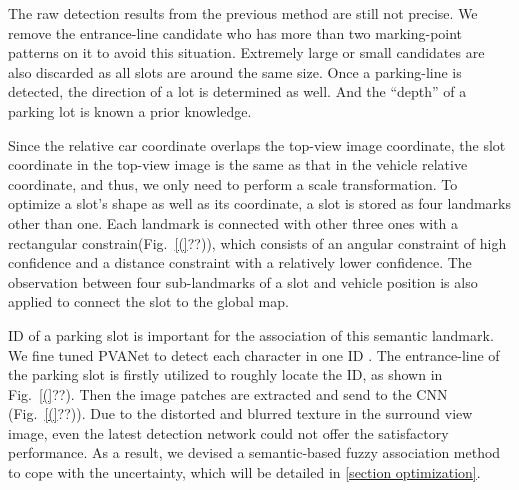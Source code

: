 \documentclass[journal]{IEEEtran}
\newcommand{\Reffig}[1]{Fig.~\ref{#1}}
\begin{document}
%
The raw detection results from the previous method are still not precise. 
We remove the entrance-line candidate who has more than two marking-point patterns on it to avoid this situation.  
Extremely large or small candidates are also discarded as all slots are around the same size.
Once a parking-line is detected, the direction of a lot is determined as well. And the “depth” of a parking lot is known a prior knowledge. 

Since the relative car coordinate overlaps the top-view image coordinate, the slot coordinate in the top-view image is the same as that in the vehicle relative coordinate, and thus, we only need to perform a scale transformation.
%
To optimize a slot's shape as well as its coordinate, a slot is stored as four landmarks other than one.
Each landmark is connected with other three ones with a rectangular constrain(\Reffig(??)), which consists of an angular constraint of high confidence and a distance constraint with a relatively lower confidence.
The observation between four sub-landmarks of a slot and vehicle position is also applied to connect the slot to the global map.

%

ID of a parking slot is important for the association of this semantic landmark.
We fine tuned PVANet to detect each character in one ID \citep{Hong2016PVANet}.
The entrance-line of the parking slot is firstly utilized to roughly locate the ID, as shown in \Reffig(??).
Then the image patches are extracted and send to the CNN (\Reffig(??)).
Due to the distorted and blurred texture in the surround view image, even the latest detection network could not offer the satisfactory performance.
As a result, we devised a semantic-based fuzzy association method to cope with the uncertainty, which will be detailed in \ref{section optimization}.  
\end{document}

